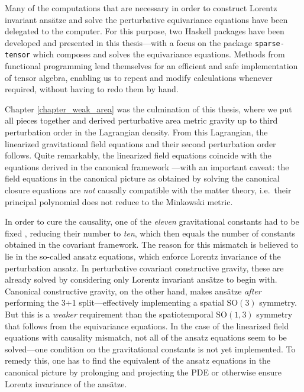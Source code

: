 Many of the computations that are necessary in order to construct Lorentz invariant ansätze and solve the perturbative equivariance equations have been delegated to the computer. For this purpose, two Haskell packages have been developed and presented in this thesis---with a focus on the package \texttt{sparse-tensor} which composes and solves the equivariance equations. Methods from functional programming lend themselves for an efficient and safe implementation of tensor algebra, enabling us to repeat and modify calculations whenever required, without having to redo them by hand.

Chapter \ref{chapter_weak_area} was the culmination of this thesis, where we put all pieces together and derived perturbative area metric gravity up to third perturbation order in the Lagrangian density. From this Lagrangian, the linearized gravitational field equations and their second perturbation order follows. Quite remarkably, the linearized field equations coincide with the equations derived in the canonical framework \cite{Schneider_2017,Alex_2019}---with an important caveat: the field equations in the canonical picture as obtained by solving the canonical closure equations \cite{D_ll_2018,Schneider_2017} are \emph{not} causally compatible with the matter theory, i.e.\ their principal polynomial does not reduce to the Minkowski metric.

In order to cure the causality, one of the \emph{eleven} gravitational constants had to be fixed \cite{Alex_2019}, reducing their number to \emph{ten}, which then equals the number of constants obtained in the covariant framework. The reason for this mismatch is believed to lie in the so-called ansatz equations, which enforce Lorentz invariance of the perturbation ansatz. In perturbative covariant constructive gravity, these are already solved by considering only Lorentz invariant ansätze to begin with. Canonical constructive gravity, on the other hand, makes ansätze \emph{after} performing the 3+1 split---effectively implementing a spatial $\mathrm{SO}(3)$ symmetry. But this is a \emph{weaker} requirement than the spatiotemporal $\mathrm{SO}(1,3)$ symmetry that follows from the equivariance equations. In the case of the linearized field equations with causality mismatch, not all of the ansatz equations seem to be solved---one condition on the gravitational constants is not yet implemented. To remedy this, one has to find the equivalent of the ansatz equations in the canonical picture by prolonging and projecting the PDE or otherwise ensure Lorentz invariance of the ansätze.

